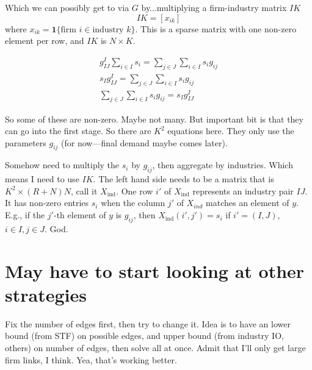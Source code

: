 \documentclass[11pt]{article}
\begin{document}
Which we can possibly get to via $G$ by...multiplying a firm-industry matrix $IK$
\[
IK = [x_{ik} ]
\]
where $x_{ik} = \mathbf{1} \{ \text{firm } i \in \text{industry } k \}$. This is a sparse matrix with one non-zero element per row, and $IK$ is $N \times K$. 

\begin{gather}
g^I_{IJ} \sum_{i\in I} s_i = \sum_{j \in J} \sum_{i \in I} s_i g_{ij} \\
s_I g^I_{IJ} = \sum_{j \in J} \sum_{i \in I} s_i g_{ij} \\
\sum_{j \in J} \sum_{i \in I} s_i g_{ij} = s_I g^I_{IJ}
\end{gather}
 
 So some of these are non-zero. Maybe not many. But important bit is that they can go into the first stage. So there are $K^2$ equations here. They only use the parameters $g_{ij}$ (for now---final demand maybe comes later).
 
 Somehow need to multiply the $s_i$ by $g_{ij}$, then aggregate by industries. Which means I need to use $IK$. The left hand side needs to be a matrix that is $K^2 \times (R+N)N$, call it $X_{\text{ind}}$. One row $i'$ of $X_{\text{ind}}$ represents an industry pair $IJ$. It has non-zero entries $s_i$ when the column $j'$ of $X_{ind}$ matches an element of $y$. E.g., if the $j'$-th element of $y$ is $g_{ij}$, then $X_{\text{ind}}(i',j') = s_i$ if $i'=(I,J)$, $i \in I, j \in J$. God.

\section{May have to start looking at other strategies}
Fix the number of edges first, then try to change it. Idea is to have an lower bound (from STF) on possible edges, and upper bound (from industry IO, others) on number of edges, then solve all at once. Admit that I'll only get large firm links, I think. Yea, that's working better.



\end{document}
